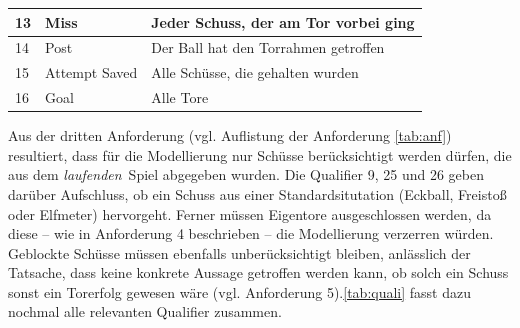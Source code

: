 \tablelasttail{}
\begin{center}%
\begin{supertabular}{ | P{2cm} | P{3cm} | P{5cm} |}
\vspace*{1mm} 13 	& \vspace*{1mm}Miss  	& Jeder Schuss, der am Tor vorbei ging	\\
\hline
\vspace*{1mm}14	& \vspace*{1mm}Post	& Der Ball hat den Torrahmen getroffen 	\\
\hline
\vspace*{1mm}15	& \vspace*{1mm}Attempt Saved  	& Alle Schüsse, die gehalten wurden	\\
\hline
\vspace*{1mm}16\vspace*{1mm}	& \vspace*{1mm}Goal\vspace*{1mm}  	& \vspace*{1mm}Alle Tore\vspace*{1mm}	\\
\hline
\end{supertabular}
\end{center}

Aus der dritten Anforderung (vgl. Auflistung der Anforderung \vref{tab:anf}) resultiert, dass für die Modellierung nur Schüsse berücksichtigt werden dürfen, die aus dem \glqq \textit{laufenden}\grqq~Spiel abgegeben wurden. Die Qualifier \textsf{9, 25} und \textsf{26} geben darüber Aufschluss, ob ein Schuss aus einer Standardsitutation (Eckball, Freistoß oder Elfmeter) hervorgeht. Ferner müssen Eigentore ausgeschlossen werden, da diese -- wie in Anforderung 4 beschrieben -- die Modellierung verzerren würden. Geblockte Schüsse müssen ebenfalls unberücksichtigt bleiben, anlässlich der Tatsache, dass keine konkrete Aussage getroffen werden kann, ob solch ein Schuss sonst ein Torerfolg gewesen wäre (vgl. Anforderung 5).\vref{tab:quali} fasst dazu nochmal alle relevanten Qualifier zusammen.

